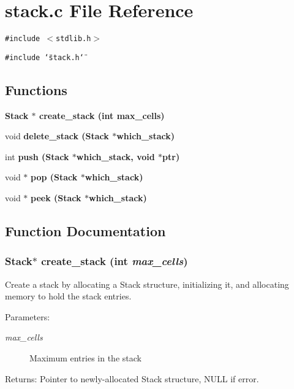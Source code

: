 \section{stack.c File Reference}
\label{stack_8c}
{\tt \#include $<$stdlib.h$>$}\par
{\tt \#include \char`\"{}stack.h\char`\"{}}\par
\subsection*{Functions}
\begin{CompactItemize}
\item 
\bf{Stack} $\ast$ \bf{create\_\-stack} (int max\_\-cells)
\item 
void \bf{delete\_\-stack} (\bf{Stack} $\ast$which\_\-stack)
\item 
int \bf{push} (\bf{Stack} $\ast$which\_\-stack, void $\ast$ptr)
\item 
void $\ast$ \bf{pop} (\bf{Stack} $\ast$which\_\-stack)
\item 
void $\ast$ \bf{peek} (\bf{Stack} $\ast$which\_\-stack)
\end{CompactItemize}


\subsection{Function Documentation}
\subsubsection{\setlength{\rightskip}{0pt plus 5cm}\bf{Stack}$\ast$ create\_\-stack (int {\em max\_\-cells})}\label{stack_8c_f3af8ef3ef58b09c15cca16fd5e09907}


Create a stack by allocating a Stack structure, initializing it, and allocating memory to hold the stack entries. \begin{Desc}
\item[Parameters:]
\begin{description}
\item[{\em max\_\-cells}]Maximum entries in the stack \end{description}
\end{Desc}
\begin{Desc}
\item[Returns:]Pointer to newly-allocated Stack structure, NULL if error. \end{Desc}
